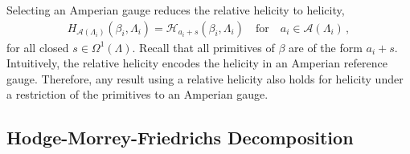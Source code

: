 \documentclass[11pt]{article}
\theoremstyle{plain}
\theoremstyle{definition}
\theoremstyle{remark}
\newcommand{\ST}{\Lambda}
\begin{document}
Selecting an Amperian gauge reduces the relative helicity to helicity,
\begin{align*}
    H_{\mathscr{A}(\ST_i)}(\beta_i,\ST_i) = \mathscr{H}_{a_i + s}(\beta_i,\ST_i) \quad \text{for} \quad a_i \in \mathscr{A}(\ST_i)  \, ,    
\end{align*}
for all closed \(s \in \Omega^1(\ST)\). Recall that all primitives of \(\beta \) are of the form \(a_i + s\). Intuitively, the relative helicity encodes the helicity in an Amperian reference gauge. Therefore, any result using a relative helicity also holds for helicity under a restriction of the primitives to an Amperian gauge. 






\subsection{Hodge-Morrey-Friedrichs Decomposition} \label{sub:Hodge}
\end{document}
